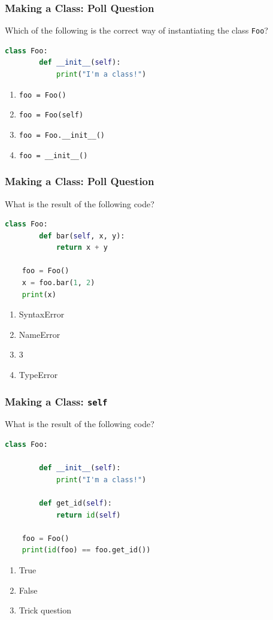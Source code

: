 \documentclass{beamer}
\begin{document}
%
%
\begin{frame}[fragile]
    \frametitle{Making a Class: Poll Question}
    Which of the following is the correct way of instantiating the class \lstinline|Foo|?
    \begin{lstlisting}[language=Python, autogobble]
    class Foo:
        def __init__(self):
            print("I'm a class!")
    \end{lstlisting}
    \vfill
    \begin{enumerate}[A]
        \item \lstinline|foo = Foo()|
        \item \lstinline|foo = Foo(self)|
        \item \lstinline|foo = Foo.__init__()|
        \item \lstinline|foo = __init__()|
    \end{enumerate}
\end{frame}

%
%
\begin{frame}[fragile]
    \frametitle{Making a Class: Poll Question}
    What is the result of the following code?
    \begin{lstlisting}[language=Python, autogobble]
    class Foo:
        def bar(self, x, y):
            return x + y

    foo = Foo()
    x = foo.bar(1, 2)
    print(x)
    \end{lstlisting}
    \vfill
    \begin{enumerate}[A]
        \item SyntaxError
        \item NameError
        \item 3
        \item TypeError
    \end{enumerate}
\end{frame}


%
%
\begin{frame}[fragile]
    \frametitle{Making a Class: \lstinline|self|}
    What is the result of the following code?
    \begin{lstlisting}[language=Python, autogobble]
    class Foo:

        def __init__(self):
            print("I'm a class!")

        def get_id(self):
            return id(self)

    foo = Foo()
    print(id(foo) == foo.get_id())
    \end{lstlisting}
    \vfill
    \begin{enumerate}[A]
        \item True
        \item False
        \item Trick question
    \end{enumerate}
\end{frame}
\end{document}
